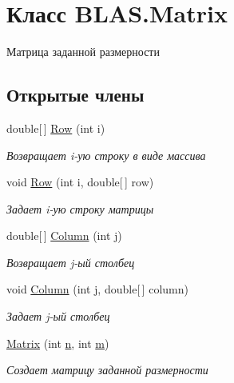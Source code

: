\hypertarget{class_b_l_a_s_1_1_matrix}{}\section{Класс B\+L\+A\+S.\+Matrix}
\label{class_b_l_a_s_1_1_matrix}


Матрица заданной размерности  


\subsection*{Открытые члены}
\begin{DoxyCompactItemize}
\item 
double\mbox{[}$\,$\mbox{]} \hyperlink{class_b_l_a_s_1_1_matrix_a6864f15a809bdaefa5b0217070a23921}{Row} (int i)
\begin{DoxyCompactList}\small\item\em Возвращает i-\/ую строку в виде массива \end{DoxyCompactList}\item 
void \hyperlink{class_b_l_a_s_1_1_matrix_a3c9a4d9b739cccdceed11ec4eb5c7891}{Row} (int i, double\mbox{[}$\,$\mbox{]} row)
\begin{DoxyCompactList}\small\item\em Задает i-\/ую строку матрицы \end{DoxyCompactList}\item 
double\mbox{[}$\,$\mbox{]} \hyperlink{class_b_l_a_s_1_1_matrix_ae656a489aa5a156e4604c40f38179c6b}{Column} (int j)
\begin{DoxyCompactList}\small\item\em Возвращает j-\/ый столбец \end{DoxyCompactList}\item 
void \hyperlink{class_b_l_a_s_1_1_matrix_ad3c635d45b5cdfe172821f86b157999c}{Column} (int j, double\mbox{[}$\,$\mbox{]} column)
\begin{DoxyCompactList}\small\item\em Задает j-\/ый столбец \end{DoxyCompactList}\item 
\hyperlink{class_b_l_a_s_1_1_matrix_a347802ba2127f13d57a24d99d36137d9}{Matrix} (int \hyperlink{class_b_l_a_s_1_1_matrix_a0faac6434774d4c500a2dce48dcd8b84}{n}, int \hyperlink{class_b_l_a_s_1_1_matrix_aa6751bae1ef176548c952a7789953bfa}{m})
\begin{DoxyCompactList}\small\item\em Создает матрицу заданной размерности \end{DoxyCompactList}\item 

\end{DoxyCompactItemize}
